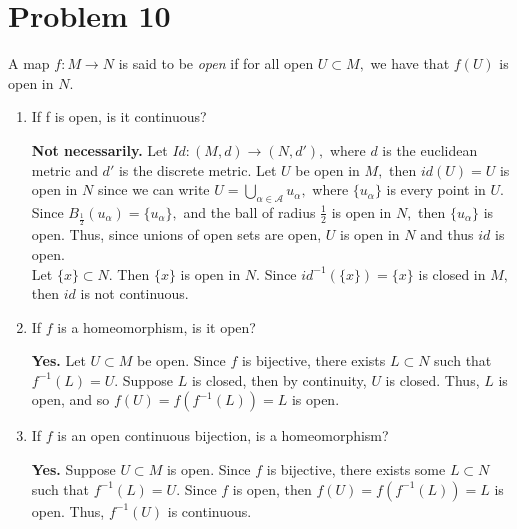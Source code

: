 \documentclass[11pt]{article}
\begin{document}
\section*{Problem 10}
\begin{problem}
    A map $f: M \to N$ is said to be \textit{open} if for all open $U\subset M,$ we have that $f(U)$ is open in $N.$
\end{problem}
\begin{enumerate}
    \item  
    \begin{problem}
        If f is open, is it continuous?
    \end{problem}
    \begin{solution}
        \textbf{Not necessarily.} Let $Id:(M,d)\to (N,d'),$ where $d$ is the euclidean metric and $d'$ is the discrete metric. Let $U$ be open in $M,$ then $id(U) = U$ is open in $N$ since we can write $U= \displaystyle\bigcup_{\alpha\in \mathscr{A}}u_\alpha,$ where $\{u_\alpha\}$ is every point in $U.$ Since $B_{\frac{1}{2}}(u_\alpha) = \{u_\alpha\},$ and the ball of radius $\frac{1}{2}$ is open in $N,$ then $\{u_\alpha\}$ is open. Thus, since unions of open sets are open, $U$ is open in $N$ and thus $id$ is open.\\
        Let $\{x\}\subset N.$ Then $\{x\}$ is open in $N.$ Since $id^{-1}(\{x\}) = \{x\}$ is closed in $M,$ then $id$ is not continuous.
    \end{solution}
    \item 
    \begin{problem}
        If $f$ is a homeomorphism, is it open?
    \end{problem}
    \begin{solution}
        \textbf{Yes.} Let $U\subset M$ be open. Since $f$ is bijective, there exists $L\subset N$ such that $f^{-1}(L) = U.$ Suppose $L$ is closed, then by continuity, $U$ is closed. Thus, $L$ is open, and so $f(U) = f(f^{-1}(L)) = L$ is open.
    \end{solution}
    \item
    \begin{problem}
        If $f$ is an open continuous bijection, is a homeomorphism?
    \end{problem}
    \begin{solution}
        \textbf{Yes.} Suppose $U\subset M$ is open. Since $f$ is bijective, there exists some $L\subset N$ such that $f^{-1}(L) = U.$ Since $f$ is open, then $f(U) = f(f^{-1}(L)) = L$ is open. Thus, $f^{-1}(U)$ is continuous.

\end{solution}
\end{enumerate}
\end{document}
